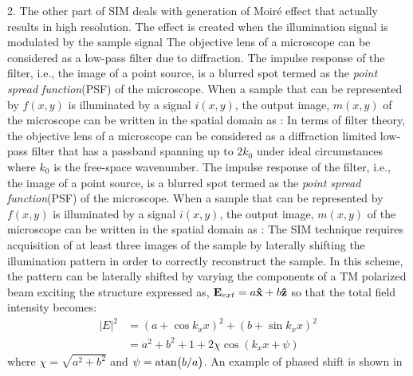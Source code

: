 \documentclass[11pt]{article}
\begin{document}
2. The other part of SIM deals with generation of Moiré effect that actually results in high resolution. The effect is created when the illumination signal is modulated by the sample signal
The objective lens of a microscope can be considered as a low-pass filter due to diffraction. The impulse response of the filter, i.e., the image of a point source, is a blurred spot termed as the \emph{point spread function}(PSF) of the microscope. When a sample that can be represented by $f(x,y)$ is illuminated by a signal $i(x,y)$, the output image, $m(x,y)$ of the microscope can be written in the spatial domain as \cite{Jost_2013}:
In terms of filter theory, the objective lens of a microscope can be considered as a diffraction limited low-pass filter that has a passband spanning up to $2k_0$ under ideal circumstances where $k_0$ is the free-space wavenumber. The impulse response of the filter, i.e., the image of a point source, is a blurred spot termed as the \emph{point spread function}(PSF) of the microscope. When a sample that can be represented by $f(x,y)$ is illuminated by a signal $i(x,y)$, the output image, $m(x,y)$ of the microscope can be written in the spatial domain as \cite{Jost_2013}:
%
The SIM technique requires acquisition of at least three images of the sample by laterally shifting the illumination pattern in order to correctly reconstruct the sample. In this scheme, the pattern can be laterally shifted by varying the components of a TM polarized beam exciting the structure expressed as, $\mathbf{E}_{ext} = a \mathbf{\hat x} + b \mathbf{\hat z}$ so that the total field intensity becomes:
\begin{equation}
  \begin{split}
    \vert E \vert^2 &= (a + \cos k_xx)^2 + (b + \sin k_xx)^2 \\
    &=  a^2 + b^2 + 1 + 2 \chi \cos(k_xx + \psi)
  \end{split}
  \label{eq:shift}
\end{equation}
%
where $\chi = \sqrt{a^2 + b^2}$ and $\psi = \atan (b/a)$. An example of phased shift is shown in \figure
\end{document}
